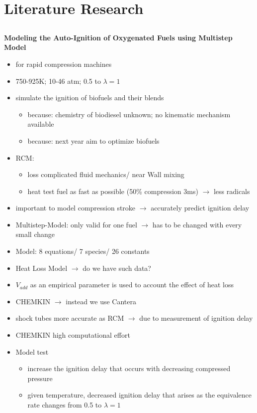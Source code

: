 \documentclass[12pt,oneside,a4paper,english]{article}
\begin{document}
\section{Literature Research} %

\subsection{\cite{toulson2010}} %
\textbf{Modeling the Auto-Ignition of Oxygenated Fuels using Multistep Model }

\begin{itemize}
\item{for rapid compression machines}
\item{750-925K; 10-46 atm; 0.5 to $\lambda=1$}
\item{simulate the ignition of biofuels and their blends}

	\begin{itemize}
	\item{because: chemistry of biodiesel unknown; no kinematic mechanism available}
	\item{because: next year aim to optimize biofuels}
	\end{itemize}

\item{RCM:}

	\begin{itemize}
	\item{loss complicated fluid mechanics/ near Wall mixing}
	\item{heat test fuel as fast as possible (50\% compression 3ms) $\rightarrow$ less radicals}
	\end{itemize}
	
\item{important to model compression stroke $\rightarrow$ accurately predict ignition delay}
\item{Multistep-Model: only valid for one fuel $\rightarrow$ has to be changed with every small change}
\item{Model: 8 equations/ 7 species/ 26 constants}
\item{Heat Loss Model $\rightarrow$ do we have such data?}
\item{$V_{add}$ as an empirical parameter is used to account the effect of heat loss}
\item{CHEMKIN $\rightarrow$ instead we use Cantera}
\item{shock tubes more accurate as RCM $\rightarrow$ due to measurement of ignition delay }
\item{CHEMKIN high computational effort}	
\item{Model test}

	\begin{itemize}
	\item{increase the ignition delay that occurs with decreasing compressed pressure}
	\item{given temperature, decreased ignition delay that arises as the equivalence rate changes from 0.5 to $\lambda = 1$}
	\end{itemize}

\end{itemize}
\end{document}
